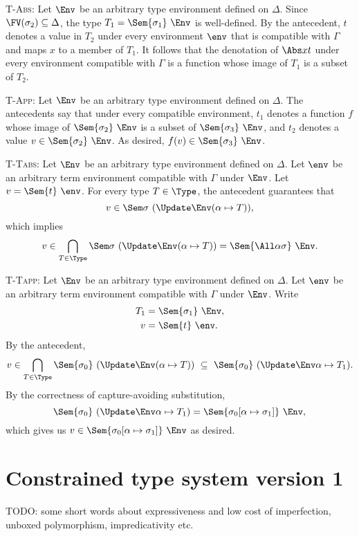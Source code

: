 \documentclass{amsart}
\begin{document}
\textsc{T-Abs}: Let $\Env$ be an arbitrary type environment
defined on $\Delta$. Since $\FV(\sigma_2)\subseteq\Delta$, the
type $T_1=\Sem{\sigma_1}~\Env$ is well-defined. By the
antecedent, $t$ denotes a value in $T_2$ under every environment
$\env$ that is compatible with $\Gamma$ and maps $x$ to a member
of $T_1$. It follows that the denotation of $\Abs xt$ under every
environment compatible with $\Gamma$ is a function whose image of
$T_1$ is a subset of $T_2$.

\textsc{T-App}: Let $\Env$ be an arbitrary type environment
defined on $\Delta$. The antecedents say that under every
compatible environment, $t_1$ denotes a function $f$ whose image
of $\Sem{\sigma_2}~\Env$ is a subset of $\Sem{\sigma_3}~\Env$,
and $t_2$ denotes a value $v\in\Sem{\sigma_2}~\Env$. As desired,
$f(v)\in\Sem{\sigma_3}~\Env$.

\textsc{T-Tabs}: Let $\Env$ be an arbitrary type environment
defined on $\Delta$. Let $\env$ be an arbitrary term environment
compatible with $\Gamma$ under $\Env$. Let $v=\Sem{t}~\env$.
For every type $T\in\Type$, the antecedent guarantees that
\[
v\in\Sem\sigma~(\Update\Env(\alpha\mapsto T)),
\]
which implies
\[
v\in\bigcap_{T\in\Type}\Sem\sigma~(\Update\Env(\alpha\mapsto T))
=\Sem{\All\alpha\sigma}~\Env.
\]

\textsc{T-Tapp}: Let $\Env$ be an arbitrary type environment
defined on $\Delta$. Let $\env$ be an arbitrary term environment
compatible with $\Gamma$ under $\Env$. Write
\begin{align*}
T_1&=\Sem{\sigma_1}~\Env,\\
v&=\Sem{t}~\env.
\end{align*}
By the antecedent,
\[
v\in
\bigcap_{T\in\Type}\Sem{\sigma_0}~(\Update\Env(\alpha\mapsto T))
\ \subseteq\ \Sem{\sigma_0}~(\Update\Env\alpha\mapsto T_1).
\]
By the correctness of capture-avoiding substitution,
\[
\Sem{\sigma_0}~(\Update\Env\alpha\mapsto T_1)
=
\Sem{\sigma_0[\alpha\mapsto\sigma_1]}~\Env,
\]
which gives us $v\in\Sem{\sigma_0[\alpha\mapsto\sigma_1]}~\Env$
as desired.


\section{Constrained type system version 1}

TODO: some short words about expressiveness and low cost of
imperfection, unboxed polymorphism, impredicativity etc.

\end{document}
